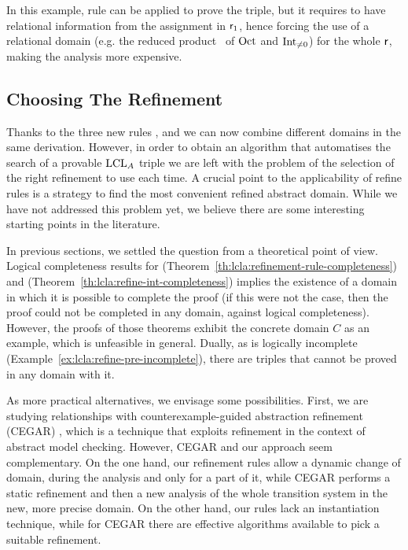 \begin{example}
	In this example, rule  can be applied to prove the triple, but it requires to have relational information from the assignment  in $\mathsf{r}_1$, hence forcing the use of a relational domain (e.g. the reduced product~\cite{CC79} of $\text{Oct}$ and $\text{Int}_{\neq 0}$) for the whole $\mathsf{r}$, making the analysis more expensive.
\end{example}

\subsection{Choosing The Refinement}\label{sec:lcla:choose-refinement}
Thanks to the three new rules ,  and  we can now combine different domains in the same derivation.
However, in order to obtain an algorithm that automatises the search of a provable $\text{LCL}_A$ triple we are left with the problem of the selection of the right refinement to use each time. A crucial point to the applicability of refine rules is a strategy to find the most convenient refined abstract domain. While we have not addressed this problem yet, we believe there are some interesting starting points in the literature.

In previous sections, we settled the question from a theoretical point of view. Logical completeness results for  (Theorem~\ref{th:lcla:refinement-rule-completeness}) and  (Theorem~\ref{th:lcla:refine-int-completeness}) implies the existence of a domain in which it is possible to complete the proof (if this were not the case, then the proof could not be completed in any domain, against logical completeness). However, the proofs of those theorems exhibit the concrete domain $C$ as an example, which is unfeasible in general. Dually, as  is logically incomplete (Example~\ref{ex:lcla:refine-pre-incomplete}), there are triples that cannot be proved in any domain with it.

As more practical alternatives, we envisage some possibilities.
First, we are studying relationships with counterexample\hyp{}guided abstraction refinement (CEGAR) \cite{CGJLV00}, which is a technique that exploits refinement in the context of abstract model checking. However, CEGAR and our approach seem complementary. On the one hand, our refinement rules allow a dynamic change of domain, during the analysis and only for a part of it, while CEGAR performs a static refinement and then a new analysis of the whole transition system in the new, more precise domain. On the other hand, our rules lack an instantiation technique, while for CEGAR there are effective algorithms available to pick a suitable refinement.

